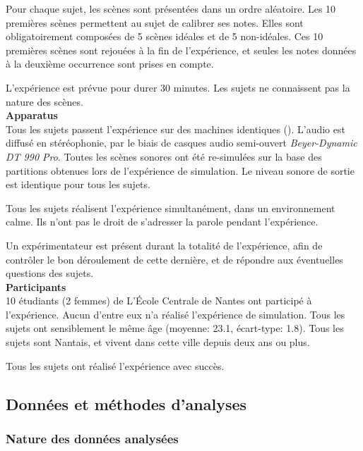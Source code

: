 Pour chaque sujet, les scènes sont présentées dans un ordre aléatoire. Les 10 premières scènes permettent au sujet de calibrer ses notes. Elles sont obligatoirement composées de 5 scènes idéales et de 5 non-idéales. Ces 10 premières scènes sont rejouées à la fin de l'expérience, et seules les notes données à la deuxième occurrence sont prises en compte. 

L'expérience est prévue pour durer 30 minutes. Les sujets ne connaissent pas la nature des scènes.\\

\textbf{Apparatus} \\

Tous les sujets passent l'expérience sur des machines identiques (). L'audio est diffusé en stéréophonie, par le biais de casques audio semi-ouvert \emph{Beyer-Dynamic DT 990 Pro}. Toutes les scènes sonores ont été re-simulées sur la base des partitions obtenues lors de l'expérience de simulation. Le niveau sonore de sortie est identique pour tous les sujets.

Tous les sujets réalisent l'expérience simultanément, dans un environnement calme. Ils n'ont pas le droit de s'adresser la parole pendant l'expérience. 

Un expérimentateur est présent durant la totalité de l'expérience, afin de contrôler le bon déroulement de cette dernière, et de répondre aux éventuelles questions des sujets.  \\

\textbf{Participants} \\

10 étudiants (2 femmes) de L’École Centrale de Nantes ont participé à l'expérience. Aucun d'entre eux n'a réalisé l'expérience de simulation. Tous les sujets ont sensiblement le même âge (moyenne: 23.1, écart-type: 1.8). Tous les sujets sont Nantais, et vivent dans cette ville depuis deux ans ou plus.

Tous les sujets ont réalisé l'expérience avec succès.

\subsection{Données et méthodes d'analyses}

\subsubsection{Nature des données analysées}
\label{sec:ch5_dataType1}

